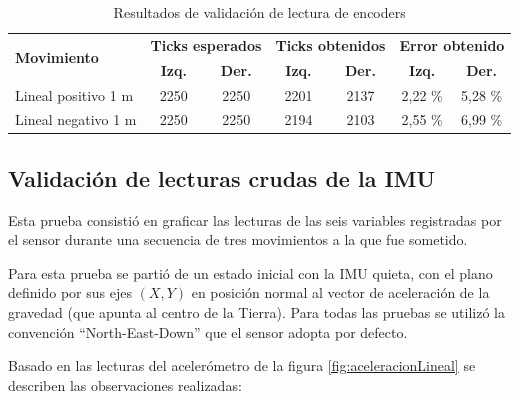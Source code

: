 \begin{table}[!htbp]
    \centering
    \caption[Lectura de encoders]{Resultados de validación de lectura de encoders}
    \begin{tabular}{lcccccc}
        \toprule
        \multirow{2}{*}{\textbf{Movimiento}} & \multicolumn{2}{l}{\textbf{Ticks esperados}} & \multicolumn{2}{l}{\textbf{Ticks obtenidos}} & \multicolumn{2}{l}{\textbf{Error obtenido}}                                                 \\
                                             & \textbf{Izq.}                                & \textbf{Der.}                                & \textbf{Izq.}                               & \textbf{Der.} & \textbf{Izq.} & \textbf{Der.} \\
        \midrule
        Lineal positivo 1 m                  & 2250                                         & 2250                                         & 2201                                        & 2137          & 2,22 \%       & 5,28 \%       \\
        Lineal negativo 1 m                  & 2250                                         & 2250                                         & 2194                                        & 2103          & 2,55 \%       & 6,99 \%       \\
        \bottomrule
        \hline
    \end{tabular}
    \label{tab:lecturaEncoders}
\end{table}

\subsection{Validación de lecturas crudas de la IMU}

Esta prueba consistió en graficar las lecturas de las seis variables registradas por el sensor durante una secuencia de tres movimientos a la que fue sometido.

Para esta prueba se partió de un estado inicial con la IMU quieta, con el plano definido por sus ejes $(X,Y)$ en posición normal al vector de aceleración de la gravedad (que apunta al centro de la Tierra). Para todas las pruebas se utilizó la convención ``North-East-Down'' \protect\footnotemark que el sensor adopta por defecto.


Basado en las lecturas del acelerómetro de la figura \ref{fig:aceleracionLineal} se describen las observaciones realizadas:

